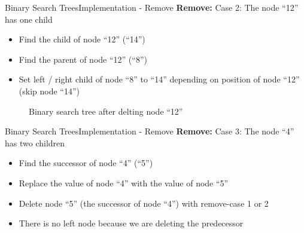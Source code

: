 \begin{frame}{Binary Search Trees}{Implementation - Remove}
  \textbf{Remove:} Case 2: The node \enquote{12} has one child\\
  \begin{itemize}
    \item
      Find the {\color{Mittel-Blau}child} of node \enquote{12} (\enquote{14})
    \item
      Find the {\color{Mittel-Blau}parent} of node \enquote{12} (\enquote{8})
    \item
      Set left / right {\color{Mittel-Blau}child} of node \enquote{8} to
      \enquote{14} depending on position of node \enquote{12}
      (skip node \enquote{14})
  \end{itemize}
  \vspace{-0.5em}
  \begin{figure}
    
    \vspace{-0.75em}
    \caption{Binary search tree after delting node \enquote{12}}
    \label{fig:binary_search_trees:binary_tree_remove_one_child_result}
  \end{figure}
\end{frame}


\begin{frame}{Binary Search Trees}{Implementation - Remove}
  \textbf{Remove:} Case 3: The node \enquote{4} has two children\\
  \begin{itemize}
    \item
      Find the {\color{Mittel-Blau}successor} of node \enquote{4} (\enquote{5})
    \item
      Replace the value of node \enquote{4} with the value of node \enquote{5}
    \item
      Delete node \enquote{5} (the {\color{Mittel-Blau}successor} of node
      \enquote{4}) with remove-case 1 or 2
    \item
      There is no left node because we are deleting the
      {\color{Mittel-Blau}predecessor}
  \end{itemize}
  \vspace{-1.5em}
  \begin{figure}
    
    \label{fig:binary_search_trees:binary_tree_remove_two_children}
  \end{figure}
\end{frame}


